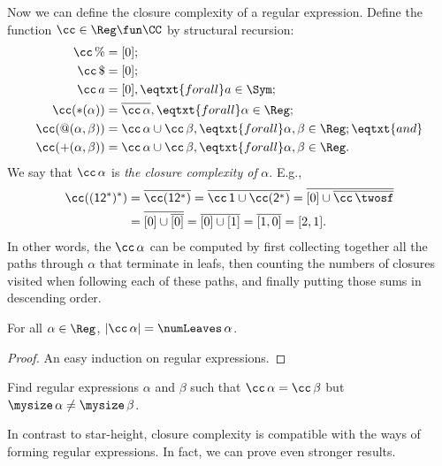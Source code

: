 Now we can define the closure complexity of a regular expression.
Define the function $\cc\in\Reg\fun\CC$ by structural recursion:
\begin{align*}
\cc\,\% &= [0]; \\
\cc\,\$ &= [0]; \\
\cc\,a &= [0], \eqtxt{for all}a\in\Sym; \\
\cc({*}(\alpha)) &= \overline{\cc\,\alpha}, \eqtxt{for all}\alpha\in\Reg;\\
\cc(@(\alpha,\beta)) &= \cc\,\alpha\cup\cc\,\beta ,
\eqtxt{for all}\alpha,\beta\in\Reg; \eqtxt{and} \\
\cc({+}(\alpha,\beta)) &= \cc\,\alpha\cup\cc\,\beta,
\eqtxt{for all}\alpha,\beta\in\Reg .
\end{align*}
We say that $\cc\,\alpha$ is \emph{the closure complexity of} $\alpha$.
E.g.,
\begin{align*}
  \cc(\mathsf{(12^*)^*})
  &= \overline{\cc(\mathsf{12^*})} =
  \overline{\cc\,\mathsf{1} \cup \cc(\mathsf{2^*})} =
  \overline{[0] \cup \overline{\cc\,\twosf}} \\
  &= \overline{[0] \cup \overline{[0]}} =
  \overline{[0] \cup [1]} =
  \overline{[1, 0]} =
  [2, 1] .
\end{align*}
In other words, the $\cc\,\alpha$ can be computed by first collecting
together all the paths through $\alpha$ that terminate in leafs, then
counting the numbers of closures visited when following each of these
paths, and finally putting those sums in descending order.

\begin{proposition}
For all $\alpha\in\Reg$, $|\cc\,\alpha| = \numLeaves\,\alpha$.
\end{proposition}

\begin{proof}
An easy induction on regular expressions.
\end{proof}

\begin{exercise}
Find regular expressions $\alpha$ and $\beta$ such that
$\cc\,\alpha = \cc\,\beta$ but $\mysize\,\alpha\neq\mysize\,\beta$.
\end{exercise}

In contrast to star-height, closure complexity is compatible with the
ways of forming regular expressions.  In fact, we can prove even
stronger results.

